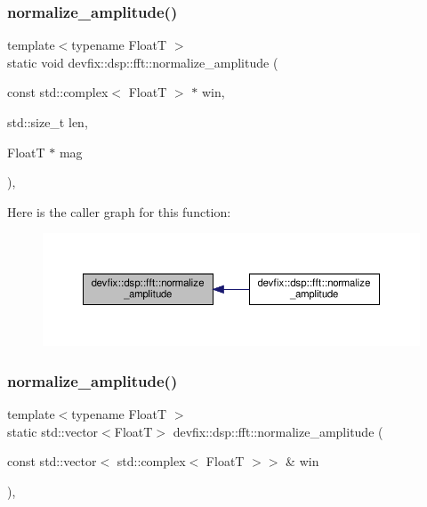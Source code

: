\subsubsection{\texorpdfstring{normalize\+\_\+amplitude()}{normalize\_amplitude()}\hspace{0.1cm}{\footnotesize\ttfamily [1/3]}}
{\footnotesize\ttfamily template$<$typename FloatT $>$ \\
static void devfix\+::dsp\+::fft\+::normalize\+\_\+amplitude (\begin{DoxyParamCaption}\item[{const std\+::complex$<$ FloatT $>$ $\ast$}]{win,  }\item[{std\+::size\+\_\+t}]{len,  }\item[{FloatT $\ast$}]{mag }\end{DoxyParamCaption})\hspace{0.3cm}{\ttfamily [inline]}, {\ttfamily [static]}}

Here is the caller graph for this function\+:\nopagebreak
\begin{figure}[H]
\begin{center}
\leavevmode
\includegraphics[width=350pt]{structdevfix_1_1dsp_1_1fft_acf63d1a93180fd7669ae52353e1beb1f_icgraph}
\end{center}
\end{figure}
\mbox{\label{structdevfix_1_1dsp_1_1fft_a3239f4400b0e1c98d5f912b129f199e8}} 
\subsubsection{\texorpdfstring{normalize\+\_\+amplitude()}{normalize\_amplitude()}\hspace{0.1cm}{\footnotesize\ttfamily [2/3]}}
{\footnotesize\ttfamily template$<$typename FloatT $>$ \\
static std\+::vector$<$FloatT$>$ devfix\+::dsp\+::fft\+::normalize\+\_\+amplitude (\begin{DoxyParamCaption}\item[{const std\+::vector$<$ std\+::complex$<$ FloatT $>$$>$ \&}]{win }\end{DoxyParamCaption})\hspace{0.3cm}{\ttfamily [inline]}, {\ttfamily [static]}}

